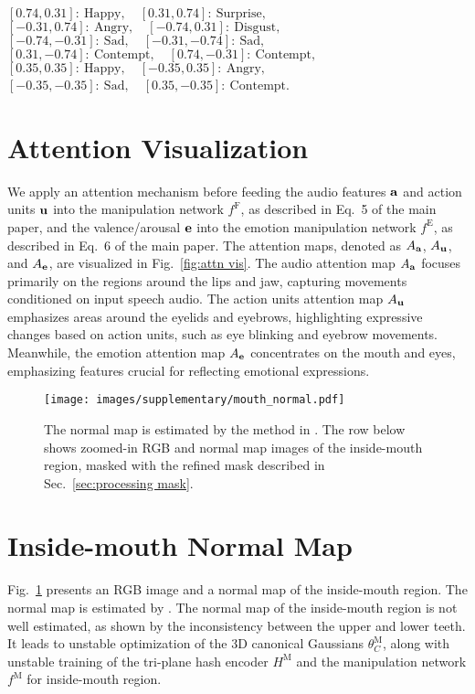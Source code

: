 \noindent\([0.74, 0.31]: \ \text{Happy}, \quad [0.31, 0.74]: \ \text{Surprise},\) \\
\([-0.31, 0.74]: \ \text{Angry}, \quad [-0.74, 0.31]: \ \text{Disgust},\) \\
\([-0.74, -0.31]: \ \text{Sad}, \quad [-0.31, -0.74]: \ \text{Sad}, \) \\
\([0.31, -0.74]: \ \text{Contempt}, \quad [0.74, -0.31]: \ \text{Contempt}, \) \\
\([0.35, 0.35]: \ \text{Happy}, \quad [-0.35, 0.35]: \ \text{Angry}, \) \\
\([-0.35, -0.35]: \ \text{Sad}, \quad [0.35, -0.35]: \ \text{Contempt}\).

\section{Attention Visualization}
We apply an attention mechanism before feeding the audio features $\mathbf{a}$ and action units $\mathbf{u}$ into the manipulation network $f^\text{F}$, as described in Eq.~5 of the main paper, and the valence/arousal $\mathbf{e}$ into the emotion manipulation network $f^\text{E}$, as described in Eq.~6 of the main paper. The attention maps, denoted as $A_{\mathbf{a}}$, $A_{\mathbf{u}}$, and $A_{\mathbf{e}}$, are visualized in Fig.~\ref{fig:attn vis}. The audio attention map $A_{\mathbf{a}}$ focuses primarily on the regions around the lips and jaw, capturing movements conditioned on input speech audio. The action units attention map $A_{\mathbf{u}}$ emphasizes areas around the eyelids and eyebrows, highlighting expressive changes based on action units, such as eye blinking and eyebrow movements. Meanwhile, the emotion attention map $A_{\mathbf{e}}$ concentrates on the mouth and eyes, emphasizing features crucial for reflecting emotional expressions.

\begin{figure}
    \centering
    \texttt{[image: images/supplementary/mouth\_normal.pdf]}
    \caption{The normal map is estimated by the method in \cite{Abrevaya_2020_CVPR}. The row below shows zoomed-in RGB and normal map images of the inside-mouth region, masked with the refined mask described in Sec.~\ref{sec:processing mask}.}
    \label{fig:inside-mouth normal map}
\end{figure}

\section{Inside-mouth Normal Map}
Fig.~\ref{fig:inside-mouth normal map} presents an RGB image and a normal map of the inside-mouth region. The normal map is estimated by \cite{Abrevaya_2020_CVPR}. The normal map of the inside-mouth region is not well estimated, as shown by the inconsistency between the upper and lower teeth. It leads to unstable optimization of the 3D canonical Gaussians $\theta^\text{M}_C$, along with unstable training of the tri-plane hash encoder $H^\text{M}$ and the manipulation network $f^\text{M}$ for inside-mouth region.

